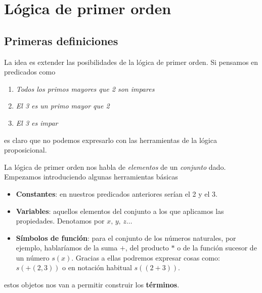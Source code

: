 \newpage
\section{Lógica de primer orden}
\subsection{Primeras definiciones}
La idea es extender las posibilidades de la lógica de primer orden. Si pensamos en predicados como 
\begin{enumerate}
	\item \textit{Todos los primos mayores que 2 son impares}
	\item \textit{El 3 es un primo mayor que 2}
	\item \textit{El 3 es impar}
\end{enumerate}
es claro que no podemos expresarlo con las herramientas de la lógica proposicional. 

La lógica de primer orden nos habla de \textit{elementos} de un \textit{conjunto} dado. Empezamos introduciendo algunas herramientas básicas 
\begin{itemize}
	\item \textbf{Constantes}: en nuestros predicados anteriores serían el 2 y el 3. 
	\item \textbf{Variables}: aquellos elementos del conjunto a los que aplicamos las propiedades. Denotamos por $x,\, y, \, z \ldots$
	\item \textbf{Símbolos de función}: para el conjunto de los números naturales, por ejemplo, hablaríamos de la suma $+$, del producto $\ast$ o de la función sucesor de un número $s(x)$. Gracias a ellas podremos expresar cosas como: $s(+(2,3))$ o en notación habitual $s((2+3))$.
\end{itemize}
estos objetos nos van a permitir construir los \textbf{términos}. 
